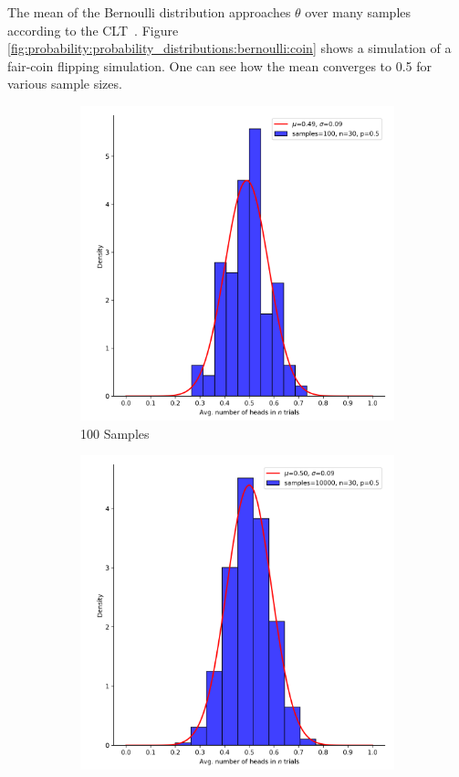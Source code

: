 The mean of the Bernoulli distribution approaches $\theta$ over many samples according to the \ac{CLT}~\cite{ref:grinstead:1997}. Figure \ref{fig:probability:probability_distributions:bernoulli:coin} shows a simulation of a fair-coin flipping simulation. One can see how the mean converges to 0.5 for various sample sizes.

\begin{figure}[htbp]
      \begin{subfigure}{0.49\textwidth}
            \includegraphics[width=\textwidth]{images/coin_flip_samples_100.png}
            \caption{100 Samples}
            \label{fig:probability:probability_distributions:bernoulli:coin_100}
      \end{subfigure}
      \begin{subfigure}{0.49\textwidth}
            \includegraphics[width=\textwidth]{images/coin_flip_samples_10000.png}

\end{subfigure}
\end{figure}
